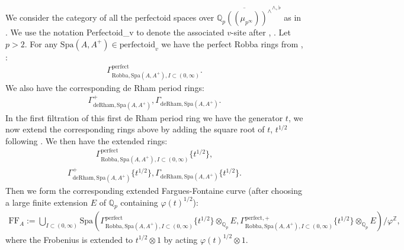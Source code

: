 \documentclass[12pt]{book}
\theoremstyle{definition}
\begin{document}
\noindent We consider the category of all the perfectoid spaces over $\overline{{\mathbb{Q}}_p((\mu_{p^\infty}))^\wedge}^{\wedge,\flat}$ as in \cite{FS}. We use the notation Perfectoid\_v to denote the associated $v$-site after \cite{FS}, \cite{Sch2}. Let $p>2$. For any $\mathrm{Spa}(A,A^+)\in \text{perfectoid}_{v}$ we have the perfect Robba rings from \cite{KL1}, \cite{KL2}:
\begin{align}
\Gamma^\text{perfect}_{\text{Robba},\mathrm{Spa}(A,A^+),I\subset (0,\infty)}.
\end{align}
We also have the corresponding de Rham period rings:
\begin{align}
\Gamma^+_{\text{deRham},\mathrm{Spa}(A,A^+)},\Gamma_{\text{deRham},\mathrm{Spa}(A,A^+)}.
\end{align}
In the first filtration of this first de Rham period ring we have the generator $t$, we now extend the corresponding rings above by adding the square root of $t$, $t^{1/2}
$ following \cite{BS}. We then have the extended rings:
\begin{align}
\Gamma^\text{perfect}_{\text{Robba},\mathrm{Spa}(A,A^+),I\subset (0,\infty)}\{t^{1/2}\},
\end{align}
\begin{align}
\Gamma^+_{\text{deRham},\mathrm{Spa}(A,A^+)}\{t^{1/2}\},\Gamma_{\text{deRham},\mathrm{Spa}(A,A^+)}\{t^{1/2}\}.
\end{align}
Then we form the corresponding extended Fargues-Fontaine curve (after choosing a large finite extension $E$ of $\mathbb{Q}_p$ containing $\varphi(t)^{1/2}$):
\begin{align}
\mathrm{FF}_A:=\bigcup_{I\subset (0,\infty)}\mathrm{Spa}(\Gamma^\text{perfect}_{\text{Robba},\mathrm{Spa}(A,A^+),I\subset (0,\infty)}\{t^{1/2}\}\otimes_{\mathbb{Q}_p}E,\Gamma^{\text{perfect},+}_{\text{Robba},\mathrm{Spa}(A,A^+),I\subset (0,\infty)}\{t^{1/2}\}\otimes_{\mathbb{Q}_p}E)/\varphi^\mathbb{Z},
\end{align}
where the Frobenius is extended to $t^{1/2}\otimes 1$ by acting $\varphi(t)^{1/2}\otimes 1$.
\end{document}
